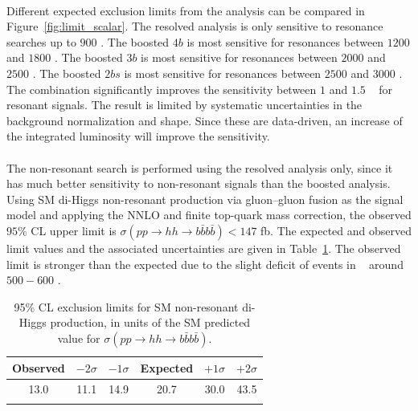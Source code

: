 \paragraph{}
Different expected exclusion limits from the analysis can be compared in Figure~\ref{fig:limit_scalar}.
The resolved analysis is only sensitive to resonance searches up to $900$ \GeV.
The boosted $4b$ is most sensitive for resonances between $1200$ and $1800$ \GeV.
The boosted $3b$ is most sensitive for resonances between $2000$ and $2500$ \GeV.
The boosted $2bs$ is most sensitive for resonances between $2500$ and $3000$ \GeV.
The combination significantly improves the sensitivity between $1$ and $1.5$ \TeV~ for resonant signals.                                                                                
The result is limited by systematic uncertainties in the background normalization and shape.
Since these are data-driven, an increase of the integrated luminosity will improve the sensitivity.

\paragraph{}
The non-resonant search is performed using the resolved analysis only, since it has much better sensitivity to non-resonant signals than the boosted analysis. 
Using SM di-Higgs non-resonant production via gluon--gluon fusion as the signal model and applying the NNLO and finite top-quark mass correction, the observed $95\%$ CL upper limit is $\sigma(pp\rightarrow hh \rightarrow b\bar{b}b\bar{b}) < 147$ fb. 
The expected and observed limit values and the associated uncertainties are given in Table~\ref{tab:smrwMhhlims}.
The observed limit is stronger than the expected due to the slight deficit of events in \mfourj~ around $500-600$ \GeV.

\begin{table}[htp]
\caption{95\% CL exclusion limits for SM non-resonant di-Higgs production, in units of the SM predicted value for ${\sigma(pp\rightarrow hh \rightarrow b\bar{b}b\bar{b})}$.}
\begin{center}
\begin{tabular}{cccccc}
\toprule
Observed & $-2\sigma$ & $-1\sigma$ & Expected & $+1\sigma$ & $+2\sigma$ \\
\midrule
13.0 & 11.1 & 14.9 & 20.7 & 30.0 & 43.5 \\
\bottomrule
\label{tab:smrwMhhlims}
\end{tabular}
\end{center}
\end{table}

